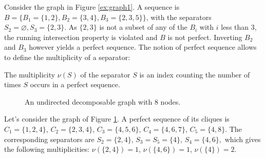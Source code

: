 Consider the graph in Figure \ref{ex:graph1}. A sequence is $B=\big\{B_1=\{1,2\}, B_2=\{3,4\},B_3=\{2,3,5\}\big\}$, with the separators $S_2=\varnothing, S_3=\{2,3\}$. As $\{2,3\}$ is not a subset of any of the $B_i$ with $i$ less than 3, the running intersection property is violated and $B$ is not perfect. Inverting $B_2$ and $B_3$ however yields a perfect sequence. 
The notion of perfect sequence allows to define the multiplicity of a separator:
 \begin{definition}
 The multiplicity $\nu (S)$ of the separator $S$ is an index counting the number of times $S$ occurs in a perfect sequence.
 \end{definition}
 
\begin{figure}[H]
 \begin{center}
 \caption{An undirected decomposable graph with 8 nodes.}
  \label{ex:graph}
    \end{center}
\end{figure}
 Let's consider the graph of Figure \ref{ex:graph}. A perfect sequence of its cliques is 
$C_1=\{1,2,4\}$, $C_2=\{2,3,4\}$, $C_3=\{4,5,6\}$, $C_4=\{4,6,7\}$, $C_5=\{4,8\}$. The corresponding separators are $S_2=\{2,4\}$, $S_3=S_5=\{4\}$, $S_4=\{4,6\},$ which gives the following multiplicities: $\nu(\{2,4\})=1$,  $\nu(\{4,6\})=1$, $\nu(\{4\})=2$.  



